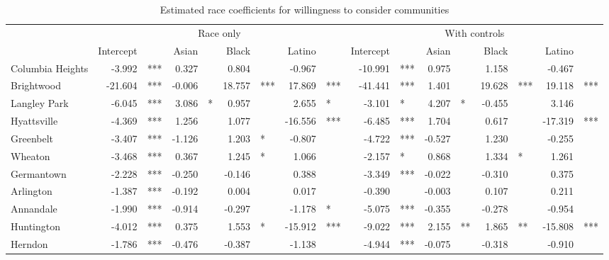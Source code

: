 % 
\begin{sidewaystable}[ht]
\centering
\caption{Estimated race coefficients for willingness to consider communities} 
\label{tab:consider}
\begin{tabular}{lrlrlrlrlrlrlrlrl}
  \toprule
  & \multicolumn{8}{c}{Race only} & \multicolumn{8}{c}{With controls}\\
 & Intercept && Asian && Black && Latino&& Intercept && Asian && Black && Latino&\\
 \midrule
Columbia Heights & -3.992 & *** & 0.327 &  & 0.804 &  & -0.967 &  & -10.991 & *** & 0.975 &  & 1.158 &  & -0.467 &  \\ 
  Brightwood & -21.604 & *** & -0.006 &  & 18.757 & *** & 17.869 & *** & -41.441 & *** & 1.401 &  & 19.628 & *** & 19.118 & *** \\ 
  Langley Park & -6.045 & *** & 3.086 & * & 0.957 &  & 2.655 & * & -3.101 & * & 4.207 & * & -0.455 &  & 3.146 &  \\ 
  Hyattsville & -4.369 & *** & 1.256 &  & 1.077 &  & -16.556 & *** & -6.485 & *** & 1.704 &  & 0.617 &  & -17.319 & *** \\ 
  Greenbelt & -3.407 & *** & -1.126 &  & 1.203 & * & -0.807 &  & -4.722 & *** & -0.527 &  & 1.230 &  & -0.255 &  \\ 
  Wheaton & -3.468 & *** & 0.367 &  & 1.245 & * & 1.066 &  & -2.157 & * & 0.868 &  & 1.334 & * & 1.261 &  \\ 
  Germantown & -2.228 & *** & -0.250 &  & -0.146 &  & 0.388 &  & -3.349 & *** & -0.022 &  & -0.310 &  & 0.375 &  \\ 
  Arlington & -1.387 & *** & -0.192 &  & 0.004 &  & 0.017 &  & -0.390 &  & -0.003 &  & 0.107 &  & 0.211 &  \\ 
  Annandale & -1.990 & *** & -0.914 &  & -0.297 &  & -1.178 & * & -5.075 & *** & -0.355 &  & -0.278 &  & -0.954 &  \\ 
  Huntington & -4.012 & *** & 0.375 &  & 1.553 & * & -15.912 & *** & -9.022 & *** & 2.155 & ** & 1.865 & ** & -15.808 & *** \\ 
  Herndon & -1.786 & *** & -0.476 &  & -0.387 &  & -1.138 &  & -4.944 & *** & -0.075 &  & -0.318 &  & -0.910 &  \\ 
   \bottomrule
\end{tabular}
\end{sidewaystable}
